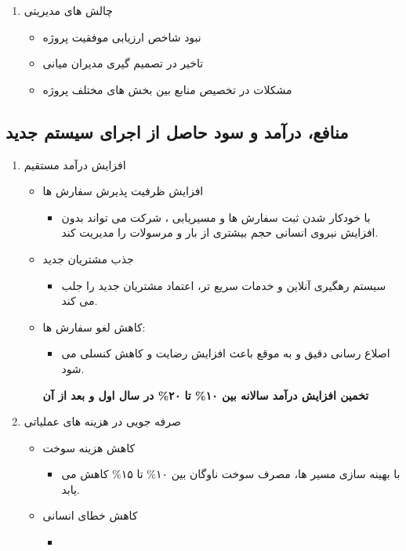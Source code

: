 \documentclass[12pt,a4paper]{report}
\begin{document}
\begin{enumerate}
	\item 
	چالش های مدیریتی
\begin{itemize}
	\item 
نبود شاخص ارزیابی موفقیت پروژه 
	\item 
تاخیر در تصمیم گیری مدیران میانی 
	\item 
مشکلات در تخصیص منابع بین بخش های مختلف پروژه
\end{itemize}
\end{enumerate}
\subsection{منافع، درآمد و سود حاصل از اجرای سیستم جدید}
\begin{enumerate}
	\item 
	افزایش درآمد مستقیم
	\begin{itemize}
		\item 
		افزایش ظرفیت پذیرش سفارش ها
		\begin{itemize}
			\item 
با خودکار شدن ثبت سفارش ها و مسیریابی ، شرکت می تواند بدون افزایش نیروی انسانی حجم بیشتری از بار و مرسولات را مدیریت کند.
		\end{itemize}
		\item 
	جذب مشتریان جدید
		\begin{itemize}
			\item 
			سیستم رهگیری آنلاین و خدمات سریع تر، اعتماد مشتریان جدید را جلب می کند.
		\end{itemize}
		\item کاهش لغو سفارش ها:
		\begin{itemize}
			\item 
			اصلاع رسانی دقیق و به موقع باعث افزایش رضایت و کاهش کنسلی می شود.
		\end{itemize}
\textbf{
تخمین افزایش درآمد سالانه بین ۱۰\% تا ۲۰\% در سال اول و بعد از آن
}
\end{itemize}
	\item 
صرفه جویی در هزینه های عملیاتی
	\begin{itemize}
		\item 
کاهش هزینه سوخت
		\begin{itemize}
			\item 
با بهینه سازی مسیر ها، مصرف سوخت ناوگان بین ۱۰\% تا ۱۵\% کاهش می یابد.
		\end{itemize}
		\item 
		کاهش خطای انسانی
		\begin{itemize}
			\item 

\end{itemize}
\end{itemize}
\end{enumerate}
\end{document}
